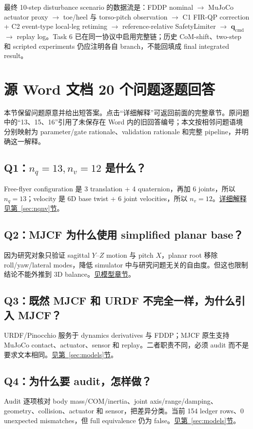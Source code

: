 \documentclass[UTF8,11pt,a4paper]{ctexart}
\begin{document}
最终 10-step disturbance scenario 的数据流是：FDDP nominal $\rightarrow$ MuJoCo actuator proxy $\rightarrow$ toe/heel 与 torso-pitch observation $\rightarrow$ C1 FIR-QP correction + C2 event-type local-leg retiming $\rightarrow$ reference-relative SafetyLimiter $\rightarrow$ $\bm q_{\mathrm{cmd}}$ $\rightarrow$ replay log。Task 6 已在同一协议中启用完整链；历史 CoM-shift、two-step 和 scripted experiments 仍应注明各自 branch，不能回填成 final integrated result。

\section{源 Word 文档 20 个问题逐题回答}\label{sec:questions}

本节保留问题原意并给出短答案。点击“详细解释”可返回前面的完整章节。原问题中的“13、15、16”引用了未保存在 Word 内的旧回答编号；本文按相邻问题语境分别映射为 parameter/gate rationale、validation rationale 和完整 pipeline，并明确这一解释。

\subsection{Q1：$n_q=13,n_v=12$ 是什么？}\label{q1}
Free-flyer configuration 是 3 translation + 4 quaternion，再加 6 joints，所以 $n_q=13$；velocity 是 6D base twist + 6 joint velocities，所以 $n_v=12$。\hyperref[sec:nqnv]{详细解释见第~\ref*{sec:nqnv}节}。

\subsection{Q2：MJCF 为什么使用 simplified planar base？}\label{q2}
因为研究对象只验证 sagittal $Y$--$Z$ motion 与 pitch $X$，planar root 移除 roll/yaw/lateral modes，降低 simulator 中与研究问题无关的自由度。但这也限制结论不能外推到 3D balance。\hyperref[sec:models]{见模型章节}。

\subsection{Q3：既然 MJCF 和 URDF 不完全一样，为什么引入 MJCF？}\label{q3}
URDF/Pinocchio 服务于 dynamics derivatives 与 FDDP；MJCF 原生支持 MuJoCo contact、actuator、sensor 和 replay。二者职责不同，必须 audit 而不是要求文本相同。\hyperref[sec:models]{见第~\ref*{sec:models}节}。

\subsection{Q4：为什么要 audit，怎样做？}\label{q4}
Audit 逐项核对 body mass/COM/inertia、joint axis/range/damping、geometry、collision、actuator 和 sensor，把差异分类。当前 154 ledger rows、0 unexpected mismatches，但 full equivalence 仍为 false。\hyperref[sec:models]{见第~\ref*{sec:models}节}。
\end{document}
